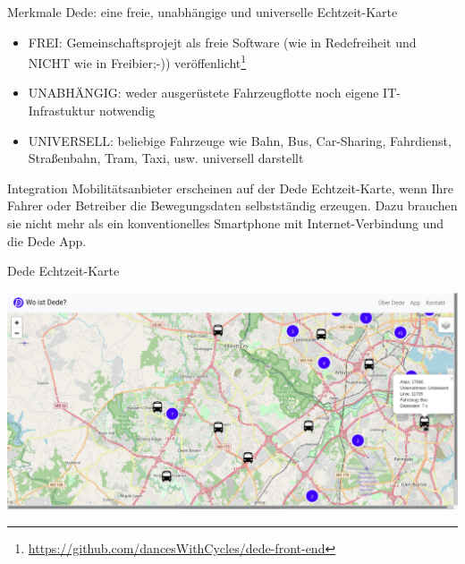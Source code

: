 
\begin{frame}{Merkmale}
  Dede: eine freie, unabhängige und universelle Echtzeit-Karte
  \begin{itemize}
  \item FREI: Gemeinschaftsprojejt als freie Software (wie in Redefreiheit und NICHT wie in Freibier;-)) veröffenlicht\footnote{\url{https://github.com/dancesWithCycles/dede-front-end}}
  \item UNABHÄNGIG: weder ausgerüstete Fahrzeugflotte noch eigene IT-Infrastuktur notwendig
  \item UNIVERSELL: beliebige Fahrzeuge wie Bahn, Bus, Car-Sharing, Fahrdienst, Straßenbahn, Tram, Taxi, usw. universell darstellt
  \end{itemize}
\end{frame}

\begin{frame}{Integration}
  Mobilitätsanbieter erscheinen auf der Dede Echtzeit-Karte, wenn Ihre Fahrer oder Betreiber die Bewegungsdaten selbstständig erzeugen. Dazu brauchen sie nicht mehr als ein konventionelles Smartphone mit Internet-Verbindung und die Dede App.
\end{frame}

\begin{frame}{Dede Echtzeit-Karte}
  \begin{center}
    \includegraphics{dede/dede_real-time_map_crop}
  \end{center}
\end{frame}

